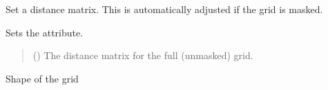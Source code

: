 \documentclass[letterpaper,10pt,english]{sphinxmanual}
\begin{document}
\begin{fulllineitems}
\begin{fulllineitems}
\begin{quote}
\begin{description}
\sphinxAtStartPar
{}

\end{description}\end{quote}

\end{fulllineitems}


\begin{fulllineitems}
\label{\detokenize{grid:glomar_gridding.grid.Grid.set_distance_matrix}}
\pysigstartsignatures
\pysiglinewithargsret
{}
{}
{}
\pysigstopsignatures
\sphinxAtStartPar
Set a distance matrix. This is automatically adjusted if the grid is
masked.

\sphinxAtStartPar
Sets the  attribute.
\begin{quote}\begin{description}
\sphinxAtStartPar
{} () \textendash{} The distance matrix for the full (unmasked) grid.

\sphinxAtStartPar
{}

\end{description}\end{quote}

\end{fulllineitems}


\begin{fulllineitems}
\label{\detokenize{grid:glomar_gridding.grid.Grid.shape}}
\pysigstartsignatures
\pysigline
{}
\pysigstopsignatures
\sphinxAtStartPar
Shape of the grid


\end{fulllineitems}
\end{fulllineitems}
\end{document}
